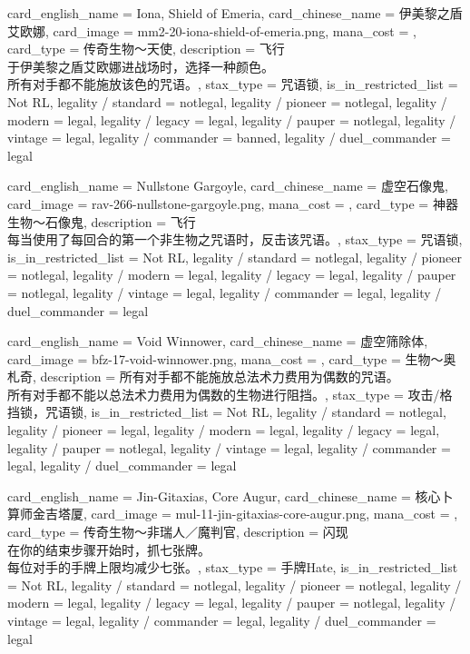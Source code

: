\documentclass[lang = cn, color = black, 10pt]{AllThatStax}
\begin{document}
\card
{
	card_english_name = {Iona, Shield of Emeria},
	card_chinese_name = {伊美黎之盾艾欧娜},
	card_image = mm2-20-iona-shield-of-emeria.png,
	mana_cost = ,
	card_type = 传奇生物～天使,
	description = {飞行\\
于伊美黎之盾艾欧娜进战场时，选择一种颜色。\\
所有对手都不能施放该色的咒语。},
	stax_type = 咒语锁,
	is_in_restricted_list = Not RL,
	legality / standard = notlegal,
	legality / pioneer = notlegal,
	legality / modern = legal,
	legality / legacy = legal,
	legality / pauper = notlegal,
	legality / vintage = legal,
	legality / commander = banned,
	legality / duel_commander = legal
}

\card
{
	card_english_name = {Nullstone Gargoyle},
	card_chinese_name = {虚空石像鬼},
	card_image = rav-266-nullstone-gargoyle.png,
	mana_cost = ,
	card_type = 神器生物～石像鬼,
	description = {飞行\\
每当使用了每回合的第一个非生物之咒语时，反击该咒语。},
	stax_type = 咒语锁,
	is_in_restricted_list = Not RL,
	legality / standard = notlegal,
	legality / pioneer = notlegal,
	legality / modern = legal,
	legality / legacy = legal,
	legality / pauper = notlegal,
	legality / vintage = legal,
	legality / commander = legal,
	legality / duel_commander = legal
}

\card
{
	card_english_name = {Void Winnower},
	card_chinese_name = {虚空筛除体},
	card_image = bfz-17-void-winnower.png,
	mana_cost = ,
	card_type = 生物～奥札奇,
	description = {所有对手都不能施放总法术力费用为偶数的咒语。\\
所有对手都不能以总法术力费用为偶数的生物进行阻挡。},
	stax_type = 攻击/格挡锁，咒语锁,
	is_in_restricted_list = Not RL,
	legality / standard = notlegal,
	legality / pioneer = legal,
	legality / modern = legal,
	legality / legacy = legal,
	legality / pauper = notlegal,
	legality / vintage = legal,
	legality / commander = legal,
	legality / duel_commander = legal
}

\card
{
	card_english_name = {Jin-Gitaxias, Core Augur},
	card_chinese_name = {核心卜算师金吉塔厦},
	card_image = mul-11-jin-gitaxias-core-augur.png,
	mana_cost = ,
	card_type = 传奇生物～非瑞人／魔判官,
	description = {闪现\\
在你的结束步骤开始时，抓七张牌。\\
每位对手的手牌上限均减少七张。},
	stax_type = 手牌Hate,
	is_in_restricted_list = Not RL,
	legality / standard = notlegal,
	legality / pioneer = notlegal,
	legality / modern = legal,
	legality / legacy = legal,
	legality / pauper = notlegal,
	legality / vintage = legal,
	legality / commander = legal,
	legality / duel_commander = legal
}
\end{document}
